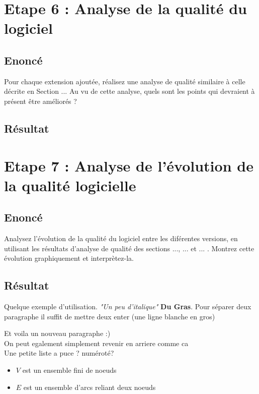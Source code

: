 \documentclass[12pt,a4paper,final]{article}
\begin{document}
\section{Etape 6 : Analyse de la qualité du logiciel}\label{sec:etape6}
\subsection{Enoncé} 
Pour chaque extension ajoutée, réalisez une analyse de qualité similaire à celle décrite en Section ... Au vu de cette analyse, quels sont les points qui devraient à présent être améliorés ?
\subsection{Résultat}



\section{Etape 7 : Analyse de l'évolution de la qualité logicielle}\label{sec:etape7}
\subsection{Enoncé} 
Analysez l'évolution de la qualité du logiciel entre les diférentes versions, en utilisant les résultats d'analyse de qualité des sections ..., ... et ... . Montrez cette évolution graphiquement et interprètez-la.
\subsection{Résultat}







Quelque exemple d'utilisation. \textit{"Un peu d'italique"} \textbf{Du Gras}. Pour séparer deux paragraphe il suffit de mettre deux enter (une ligne blanche en gros)

Et voila un nouveau paragraphe :)\\
On peut egalement simplement revenir en arriere comme ca \\

Une petite liste a puce ? numéroté?

\begin{itemize}
\item $V$ est un ensemble fini de noeuds
\item $E$ est un ensemble d'arcs reliant deux noeuds
\end{itemize}
\end{document}
